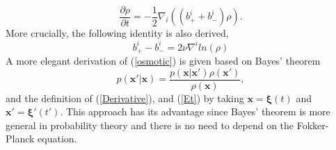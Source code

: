 \documentclass[%
 aip, 
 amsmath,amssymb,amsthm,
 nofootinbib,
 reprint,
]{revtex4-1}
\begin{document}
\begin{equation}
    \label{contP}
    \frac{\partial \rho}{\partial t} = - \frac{1}{2}\nabla_i((b_+^i + b_-^i)\rho).
\end{equation}
More crucially, the following identity is also derived,
\begin{equation}
    \label{osmotic}
    b_+^i - b_-^i = 2\nu\nabla^i ln(\rho)
\end{equation}
A more elegant derivation of (\ref{osmotic}) is given based on Bayes' theorem~\cite{Caticha} 
\begin{equation}
    \label{Bayes}
    p(\mathbf{x}'|\mathbf{x}) = \frac{p(\mathbf{x}|\mathbf{x}')\rho(\mathbf{x}')}{\rho(\mathbf{x})},
\end{equation}
and the definition of (\ref{Derivative}), and (\ref{Et}) by taking $\mathbf{x}=\mathbf{\xi}(t)$ and $\mathbf{x}'=\mathbf{\xi}'(t')$. This approach has its advantage since Bayes' theorem is more general in probability theory and there is no need to depend on the Fokker-Planck equation.
\end{document}
